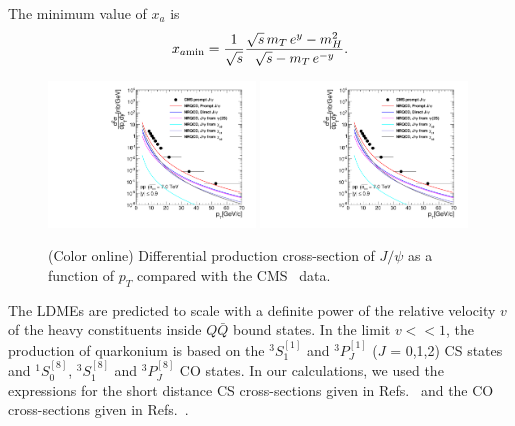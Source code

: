 \documentclass[aps,prc,preprint,superscriptaddress,showpacs,showkeys,amsmath]{revtex4-1}
\begin{document}
The minimum value of $x_a$ is 
\begin{equation}
x_{a\rm min} = \frac{1}{\sqrt{s}}\frac{\sqrt{s}\,m_T\,e^{y}-m^2_H}{\sqrt{s}-m_T\,e^{-y}}.
\end{equation}

\begin{figure}
\includegraphics[width=0.49\textwidth]{Fig1a_JPsi_CMS_Y09_S7TeV.pdf}
\includegraphics[width=0.49\textwidth]{Fig1a_JPsi_CMS_Y09_S7TeV.pdf}
\caption{(Color online) Differential production cross-section of $J/\psi$ as a function of $p_{T}$ compared 
  with the CMS~\cite{jhep02} data.}
\label{fig:TauVsTemp}
\end{figure}


The LDMEs are predicted to scale with a definite power of the relative velocity $v$ of the heavy constituents inside $Q\bar Q$ bound states. 
In the limit $v<<1$, the production of quarkonium is based on the $^3S_1^{[1]}$ and $^3P_J^{[1]}$ ($J$ = 0,1,2) CS states 
and $^1S_0^{[8]}$, $^3S_1^{[8]}$ and $^3P_J^{[8]}$ CO states. In our calculations, we used the expressions for the short distance CS cross-sections 
given in Refs.~\cite{Baier:1983va,Humpert:1986cy,Gastmans:1987be} and the CO cross-sections given in Refs.~\cite{Cho:1995vh,Cho:1995ce}.
\end{document}
